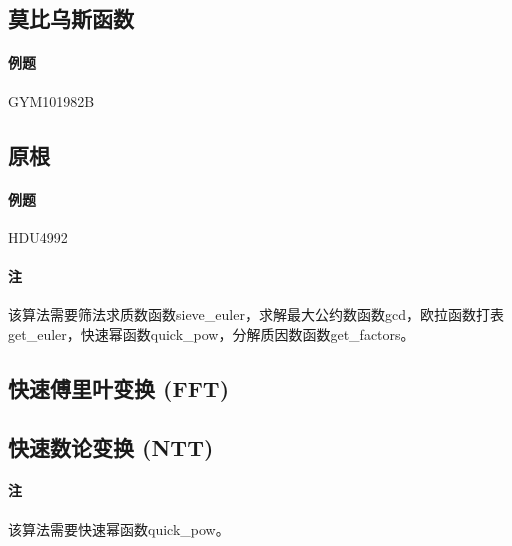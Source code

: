 \subsection{莫比乌斯函数}

\paragraph{例题} GYM101982B



\subsection{原根}

\paragraph{例题} HDU4992

\paragraph{注} 该算法需要筛法求质数函数sieve\_euler，求解最大公约数函数gcd，欧拉函数打表get\_euler，快速幂函数quick\_pow，分解质因数函数get\_factors。



\subsection{快速傅里叶变换 (FFT)}


\subsection{快速数论变换 (NTT)}

\paragraph{注} 该算法需要快速幂函数quick\_pow。


